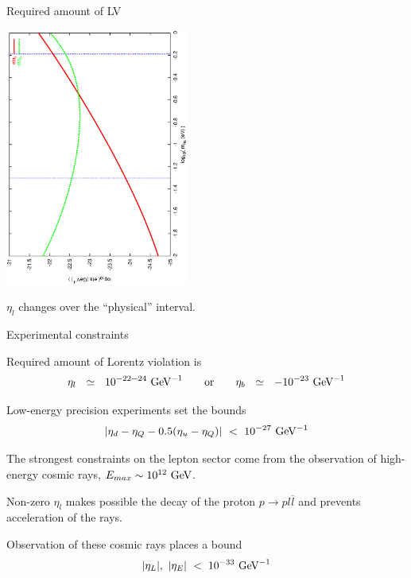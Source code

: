 \documentclass[pdf,UofT06talk,slideColor,colorBG,accumulate]{prosper}
\newcommand{\ov}{\overline}
\newcommand{\GeV}{{\rm GeV}}
\begin{document}
\begin{slide}{Required amount of LV}

\begin{center}
\includegraphics[width=6cm,angle=270]{scan_log.ps}
\end{center}

$ \eta_l $ changes over the ``physical'' interval.

\end{slide}

\begin{slide}{Experimental constraints}

	Required amount of Lorentz violation is
\[
	\eta_l ~~\simeq~~ 10^{-22-24}~\GeV^{-1} \qquad
	\text{or} \qquad \eta_b ~~\simeq~~  - 10^{-23}~\GeV^{-1}
\]

	Low-energy precision experiments set the bounds
\[
|\eta_d-\eta_Q - 0.5(\eta_u-\eta_Q)| ~<~ 10^{-27}~{\rm GeV}^{-1}
\]

	The strongest constraints on the lepton sector come from
	the observation of high-energy cosmic rays, 
	$ E_{max} \sim 10^{12}~\GeV $.

	Non-zero $ \eta_l $ makes possible the decay of the proton
	$ p \to p l \ov{l} $ and prevents acceleration of the rays.

	Observation of these cosmic rays places a bound
\[
	|\eta_L|, ~|\eta_E| ~<~ 10^{-33}~{\rm GeV}^{-1}
\]

\end{slide}
\end{document}
